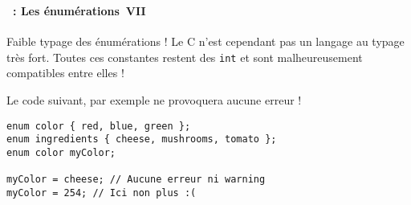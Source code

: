 \begin{frame}[containsverbatim]
  \frametitle{\secname}
  \framesubtitle{\subsecname~: Les énumérations~VII} 

  \begin{alertblock}{Faible typage des énumérations !}
    Le C n'est cependant pas un langage au typage très fort. Toutes ces constantes restent des \verb|int| et sont
    malheureusement compatibles entre elles !
    \vspace{0.3cm}
    \par
    Le code suivant, par exemple ne provoquera aucune erreur !
    \par
    \begin{verbatim}
enum color { red, blue, green };
enum ingredients { cheese, mushrooms, tomato };
enum color myColor;

myColor = cheese; // Aucune erreur ni warning
myColor = 254; // Ici non plus :(\end{verbatim}
  \end{alertblock}
\end{frame}

